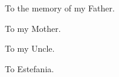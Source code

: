 \begin{center}
  \vfill

  To the memory of my Father.

  \vfill

  To my Mother.

  \vfill

  To my Uncle.

  \vfill

  To Estefania.

  \vfill

\end{center}
